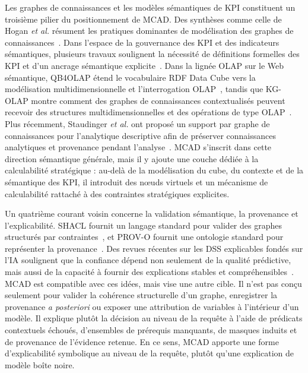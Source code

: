 \documentclass[journal]{IEEEtran}
\begin{document}
Les graphes de connaissances et les modèles sémantiques de KPI constituent un troisième pilier du positionnement de MCAD. Des synthèses comme celle de Hogan \emph{et al.} résument les pratiques dominantes de modélisation des graphes de connaissances~\cite{HoganKGSurvey2021}. Dans l'espace de la gouvernance des KPI et des indicateurs sémantiques, plusieurs travaux soulignent la nécessité de définitions formelles des KPI et d'un ancrage sémantique explicite~\cite{DiamantiniKPISurvey2025,Niedritis2011}. Dans la lignée OLAP sur le Web sémantique, QB4OLAP étend le vocabulaire RDF Data Cube vers la modélisation multidimensionnelle et l'interrogation OLAP~\cite{Etcheverry2014}, tandis que KG-OLAP montre comment des graphes de connaissances contextualisés peuvent recevoir des structures multidimensionnelles et des opérations de type OLAP~\cite{SchuetzSerafiniBozzato2021}. Plus récemment, Staudinger \emph{et al.} ont proposé un support par graphe de connaissances pour l'analytique descriptive afin de préserver connaissances analytiques et provenance pendant l'analyse~\cite{StaudingerSchuetzSchrefl2025}. MCAD s'inscrit dans cette direction sémantique générale, mais il y ajoute une couche dédiée à la calculabilité stratégique : au-delà de la modélisation du cube, du contexte et de la sémantique des KPI, il introduit des nœuds virtuels et un mécanisme de calculabilité rattaché à des contraintes stratégiques explicites.

Un quatrième courant voisin concerne la validation sémantique, la provenance et l'explicabilité. SHACL fournit un langage standard pour valider des graphes structurés par contraintes~\cite{SHACL2017}, et PROV-O fournit une ontologie standard pour représenter la provenance~\cite{PROVO2013}. Des revues récentes sur les DSS explicables fondés sur l'IA soulignent que la confiance dépend non seulement de la qualité prédictive, mais aussi de la capacité à fournir des explications stables et compréhensibles~\cite{KostopoulosXAIDSS2024}. MCAD est compatible avec ces idées, mais vise une autre cible. Il n'est pas conçu seulement pour valider la cohérence structurelle d'un graphe, enregistrer la provenance \emph{a posteriori} ou exposer une attribution de variables à l'intérieur d'un modèle. Il explique plutôt la décision au niveau de la requête à l'aide de prédicats contextuels échoués, d'ensembles de prérequis manquants, de masques induits et de provenance de l'évidence retenue. En ce sens, MCAD apporte une forme d'explicabilité symbolique au niveau de la requête, plutôt qu'une explication de modèle boîte noire.
\end{document}
